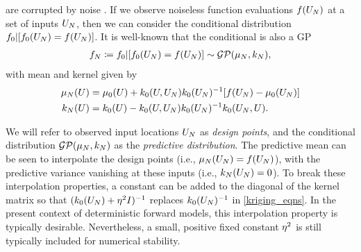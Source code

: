 \documentclass[12pt]{article}
\begin{document}
are corrupted by noise \citep{stochasticComputerModels,VehtariParallelGP,OakleyllikEm}. 
If we observe noiseless function evaluations $\func(\designIn)$ at a set of inputs $\designIn$, then we can consider
the conditional distribution $\funcPrior|[\funcPrior(\designIn)=\func(\designIn)]$. It is well-known
\citep{gpML} that the conditional is also a GP
\begin{align}
\funcEm[\Ndesign] \Def \funcPrior|[\funcPrior(\designIn)=\func(\designIn)]\sim \GP(\gpMean[\Ndesign], \gpKer[\Ndesign]), \label{generic_gp_conditional}
\end{align}
with mean and kernel given by
\begin{align}
\gpMean[\Ndesign](\parMat) &= \gpMeanPrior(\parMat) + \gpKerPrior(\parMat, \designIn) \gpKerPrior(\designIn)^{-1} [\func(\designIn) - \gpMeanPrior(\designIn)] \label{kriging_eqns} \\
\gpKer[\Ndesign](\parMat) &= \gpKerPrior(\parMat) - \gpKerPrior(\parMat, \designIn) \gpKerPrior(\designIn)^{-1} \gpKerPrior(\designIn, \parMat). \nonumber
\end{align}

We will refer to observed input locations $\designIn$ as \textit{design points}, and the conditional
distribution $\GP(\gpMean[\Ndesign], \gpKer[\Ndesign])$ as the \textit{predictive distribution}.
The predictive mean can be seen to interpolate the design points (i.e., $\gpMean[\Ndesign](\designIn) = \func(\designIn[\Ndesign])$), with 
the predictive variance vanishing at these inputs (i.e., $\gpKer[\Ndesign](\designIn) = 0$). 
To break these interpolation properties,
a constant can be added to the diagonal of the kernel matrix so that $(\gpKerPrior(\designIn) + \nuggetSD^2 I)^{-1}$ replaces 
$\gpKerPrior(\designIn)^{-1}$ in \cref{kriging_eqns}. In the present context of deterministic forward models, 
this interpolation property is typically desirable. Nevertheless, a small, positive fixed constant $\nuggetSD^2$ is still 
typically included for numerical stability. 
\end{document}
